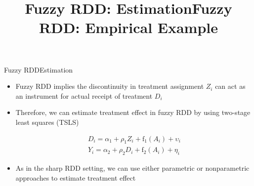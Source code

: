 \documentclass[dvipsnames,hyperref={pdfpagelabels=false}]{beamer}
\begin{document}
\title[]  
{Fuzzy RDD: Estimation}


\author 
{}

\institute{}






\date
{}


\begin{frame}{}
	\titlepage
\end{frame}






\begin{frame}{Fuzzy RDD}{Estimation}
	\begin{itemize}
		\item Fuzzy RDD implies the discontinuity in treatment assignment $Z_{i}$ can act as an instrument for actual receipt of treatment $D_{i}$
		\vspace{0.2cm}
		\item Therefore, we can estimate treatment effect in fuzzy RDD by using two-stage least squares (TSLS)
		
		\begin{equation*}
			\begin{aligned}
				D_i=\alpha_{1}+\rho_{1} Z_i+\mathrm{f}_{1}(A_i)+\upsilon_i   \\
				Y_i=\alpha_{2}+\rho_{2} D_i+\mathrm{f}_{2}(A_i)+\eta_i
			\end{aligned}
		\end{equation*}
		
		\item As in the sharp RDD setting, we can use either parametric or nonparametric approaches to estimate treatment effect
		
	\end{itemize}
\end{frame}





\title[]  
{Fuzzy RDD: Empirical Example}


\author 
{}

\institute{}
\end{document}
